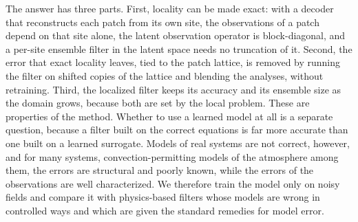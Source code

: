 The answer has three parts. First, locality can be made exact: with a
decoder that reconstructs each patch from its own site, the observations
of a patch depend on that site alone, the latent observation operator is
block-diagonal, and a per-site ensemble filter in the latent space
needs no truncation of it. Second, the error that exact locality
leaves, tied to the patch lattice, is removed by running the filter on
shifted copies of the lattice and blending the analyses, without
retraining. Third, the localized filter keeps its accuracy and its
ensemble size as the domain grows, because both are set by the local
problem. These are properties of the method. Whether to use a learned
model at all is a separate question, because a filter built on the
correct equations is far more accurate than one built on a learned
surrogate. Models of real systems are not correct, however, and for many
systems, convection-permitting models of the atmosphere among them, the
errors are structural and poorly known, while the errors of the
observations are well characterized. We therefore train the model only on
noisy fields and compare it with physics-based filters whose models are
wrong in controlled ways and which are given the standard remedies for
model error.


